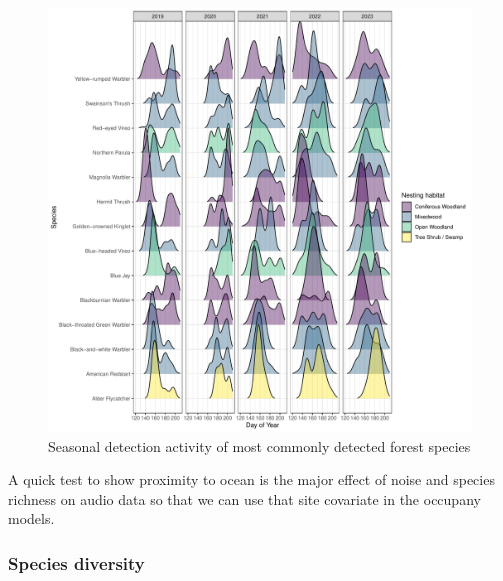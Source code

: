 \documentclass[
  letterpaper,
  DIV=11,
  numbers=noendperiod,
  oneside]{scrartcl}
\begin{document}
\begin{figure}

{\centering \includegraphics{peinp_files/figure-pdf/fig-spp-activity-1.pdf}

}

\caption{\label{fig-spp-activity}Seasonal detection activity of most
commonly detected forest species}

\end{figure}

A quick test to show proximity to ocean is the major effect of noise and
species richness on audio data so that we can use that site covariate in
the occupany models.

\hypertarget{species-diversity}{%
\subsubsection{Species diversity}\label{species-diversity}}
\end{document}
